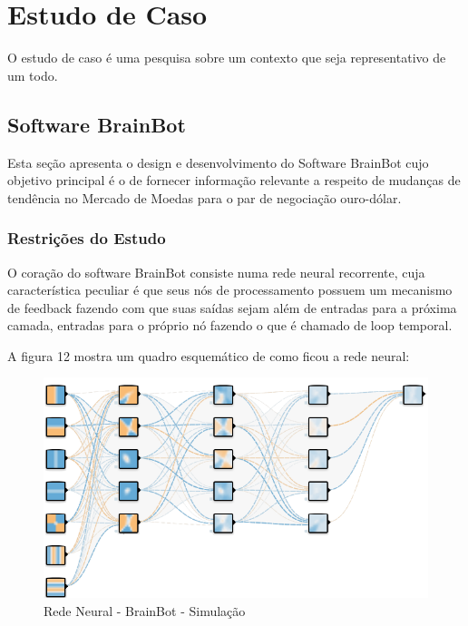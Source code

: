 \chapter[Estudo de Caso]{Estudo de Caso}

O estudo de caso é uma pesquisa sobre um contexto que seja representativo de um todo. \cite{cervo}

\section[Software BrainBot]{Software BrainBot}

Esta seção apresenta o design e desenvolvimento do Software BrainBot cujo objetivo principal é o de fornecer informação relevante
a respeito de mudanças de tendência no Mercado de Moedas para o par de negociação ouro-dólar.

\subsection[Restrições do Estudo]{Restrições do Estudo}

O coração do software BrainBot consiste numa rede neural recorrente, cuja característica peculiar é que seus nós de processamento possuem
um mecanismo de feedback fazendo com que suas saídas sejam além de entradas para a próxima camada, entradas para o próprio nó fazendo o que
é chamado de loop temporal.

A figura 12 mostra um quadro esquemático de como ficou a rede neural:

\begin{figure}[h]
	\centering
	\includegraphics[keepaspectratio=true,scale=0.5]{figuras/desenho.png}
	\caption{Rede Neural - BrainBot - Simulação \cite{tensor}}
	\label{fig12}
\end{figure}

